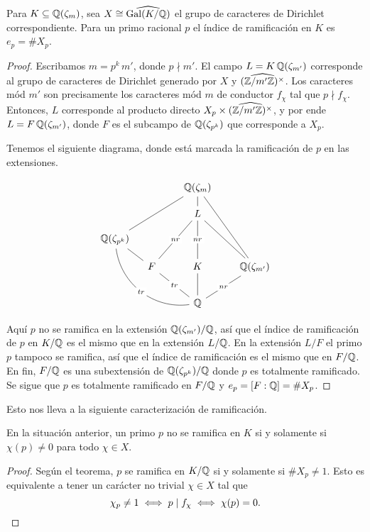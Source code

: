 \begin{teorema}
  Para $K \subseteq \mathbb{Q} (\zeta_m)$, sea $X \cong \widehat{\operatorname{Gal} (K/\mathbb{Q})}$
  el grupo de caracteres de Dirichlet correspondiente. Para un primo racional
  $p$ el índice de ramificación en $K$ es $e_p = \# X_p$.

  \begin{proof}
    Escribamos $m = p^k\,m'$, donde $p \nmid m'$.
    El campo $L = K\,\mathbb{Q} (\zeta_{m'})$ corresponde al grupo de caracteres de
    Dirichlet generado por $X$ y $\widehat{(\mathbb{Z}/m'\mathbb{Z})^\times}$. Los caracteres
    mód $m'$ son precisamente los caracteres mód $m$ de conductor $f_\chi$ tal
    que $p \nmid f_\chi$. Entonces, $L$ corresponde al producto directo
    $X_p \times \widehat{(\mathbb{Z}/m'\mathbb{Z})^\times}$, y por ende
    $L = F\,\mathbb{Q} (\zeta_{m'})$, donde $F$ es el subcampo de $\mathbb{Q} (\zeta_{p^k})$
    que corresponde a $X_p$.

    Tenemos el siguiente diagrama, donde está marcada la ramificación de $p$
    en las extensiones.

    \[ \begin{tikzcd}[row sep=1em, column sep=1em]
      & & & \QQ (\zeta_m)\ar[-]{d}\ar[-]{dddrr}\ar[-]{ddlll} \\
       & & & L\ar[-]{ddll}[description]{nr}\ar[-]{dd}[description]{nr}\ar[-]{ddrr} \\
      \QQ (\zeta_{p^k})\ar[-]{dr}\ar[-,bend right=45]{dddrrr}[description]{tr} \\
      & F\ar[-]{ddrr}[description]{tr} & & K\ar[-]{dd} & & \QQ (\zeta_{m'})\ar[-]{ddll}[description]{nr} \\
      \\
       & & & \QQ
    \end{tikzcd} \]

    Aquí $p$ no se ramifica en la extensión $\mathbb{Q} (\zeta_{m'})/\mathbb{Q}$, así que el
    índice de ramificación de $p$ en $K/\mathbb{Q}$ es el mismo que en la extensión
    $L/\mathbb{Q}$. En la extensión $L/F$ el primo $p$ tampoco se ramifica, así que
    el índice de ramificación es el mismo que en $F/\mathbb{Q}$.
    En fin, $F/\mathbb{Q}$ es una subextensión de $\mathbb{Q} (\zeta_{p^k})/\mathbb{Q}$ donde $p$
    es totalmente ramificado. Se sigue que $p$ es totalmente ramificado en
    $F/\mathbb{Q}$ y $e_p = [F : \mathbb{Q}] = \# X_p$.
  \end{proof}
\end{teorema}

Esto nos lleva a la siguiente caracterización de ramificación.

\begin{corolario}
  En la situación anterior, un primo $p$ no se ramifica en $K$ si y solamente si
  $\chi (p) \ne 0$ para todo $\chi \in X$.

  \begin{proof}
    Según el teorema, $p$ se ramifica en $K/\mathbb{Q}$ si y solamente si
    $\# X_p \ne 1$. Esto es equivalente a tener un carácter no trivial
    $\chi \in X$ tal que
    \[ \chi_p \ne 1 \iff p \mid f_\chi \iff \chi (p) = 0. \qedhere \]
  \end{proof}
\end{corolario}

